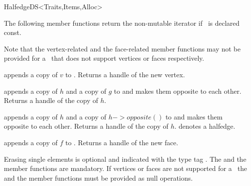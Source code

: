 \begin{ccRefConcept}{HalfedgeDS<Traits,Items,Alloc>}

The following member functions return the non-mutable iterator if
\ccVar\ is declared const.

\ccGlue
{}
\ccGlue
{}
\ccGlue
{}
\ccGlue
{}
\ccGlue
{}

\ccTagFullDeclarations

Note that the vertex-related and the face-related member functions may
not be provided for a \ccRefName\ that does not support vertices or
faces respectively.

    {appends a copy of $v$ to . Returns a handle of the new vertex.}

    {appends a copy of $h$ and a copy of $g$ to  and makes them
     opposite to each other. Returns a handle of the copy of $h$.}

    {appends a copy of $h$ and a copy of $h->opposite()$ to  and 
     makes them opposite to each other. Returns a handle of the copy of $h$.
     \ccPrecond {} denotes a halfedge.}

    {appends a copy of $f$ to . Returns a handle of the new face.}



Erasing single elements is optional and indicated with the type tag
. The  and the  member 
functions are mandatory. If vertices or faces are not supported 
for a \ccRefName\ the  and the  member 
functions must be provided as null operations.



\end{ccRefConcept}
